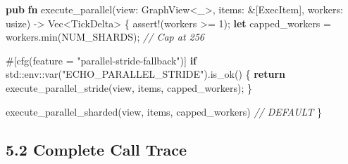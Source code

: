 \documentclass[11pt]{book}
\newenvironment{Shaded}{}{}
\newcommand{\AttributeTok}[1]{\textcolor[rgb]{0.49,0.56,0.16}{#1}}
\newcommand{\CommentTok}[1]{\textcolor[rgb]{0.38,0.63,0.69}{\textit{#1}}}
\newcommand{\ControlFlowTok}[1]{\textcolor[rgb]{0.00,0.44,0.13}{\textbf{#1}}}
\newcommand{\DataTypeTok}[1]{\textcolor[rgb]{0.56,0.13,0.00}{#1}}
\newcommand{\DecValTok}[1]{\textcolor[rgb]{0.25,0.63,0.44}{#1}}
\newcommand{\KeywordTok}[1]{\textcolor[rgb]{0.00,0.44,0.13}{\textbf{#1}}}
\newcommand{\NormalTok}[1]{#1}
\newcommand{\OperatorTok}[1]{\textcolor[rgb]{0.40,0.40,0.40}{#1}}
\newcommand{\OtherTok}[1]{\textcolor[rgb]{0.00,0.44,0.13}{#1}}
\newcommand{\PreprocessorTok}[1]{\textcolor[rgb]{0.74,0.48,0.00}{#1}}
\newcommand{\StringTok}[1]{\textcolor[rgb]{0.25,0.44,0.63}{#1}}
\begin{document}
\begin{Shaded}
\begin{Highlighting}[]
\KeywordTok{pub} \KeywordTok{fn}\NormalTok{ execute\_parallel(view}\OperatorTok{:}\NormalTok{ GraphView}\OperatorTok{\textless{}}\OtherTok{\textquotesingle{}\_}\OperatorTok{\textgreater{},}\NormalTok{ items}\OperatorTok{:} \OperatorTok{\&}\NormalTok{[ExecItem]}\OperatorTok{,}\NormalTok{ workers}\OperatorTok{:} \DataTypeTok{usize}\NormalTok{) }\OperatorTok{{-}\textgreater{}} \DataTypeTok{Vec}\OperatorTok{\textless{}}\NormalTok{TickDelta}\OperatorTok{\textgreater{}} \OperatorTok{\{}
    \PreprocessorTok{assert!}\NormalTok{(workers }\OperatorTok{\textgreater{}=} \DecValTok{1}\NormalTok{)}\OperatorTok{;}
    \KeywordTok{let}\NormalTok{ capped\_workers }\OperatorTok{=}\NormalTok{ workers}\OperatorTok{.}\NormalTok{min(NUM\_SHARDS)}\OperatorTok{;}  \CommentTok{// Cap at 256}

    \AttributeTok{\#[}\NormalTok{cfg}\AttributeTok{(}\NormalTok{feature }\OperatorTok{=} \StringTok{"parallel{-}stride{-}fallback"}\AttributeTok{)]}
    \ControlFlowTok{if} \PreprocessorTok{std::env::}\NormalTok{var(}\StringTok{"ECHO\_PARALLEL\_STRIDE"}\NormalTok{)}\OperatorTok{.}\NormalTok{is\_ok() }\OperatorTok{\{}
        \ControlFlowTok{return}\NormalTok{ execute\_parallel\_stride(view}\OperatorTok{,}\NormalTok{ items}\OperatorTok{,}\NormalTok{ capped\_workers)}\OperatorTok{;}
    \OperatorTok{\}}

\NormalTok{    execute\_parallel\_sharded(view}\OperatorTok{,}\NormalTok{ items}\OperatorTok{,}\NormalTok{ capped\_workers)  }\CommentTok{// DEFAULT}
\OperatorTok{\}}
\end{Highlighting}
\end{Shaded}

\subsection{5.2 Complete Call Trace}\label{complete-call-trace-2}
\end{document}
